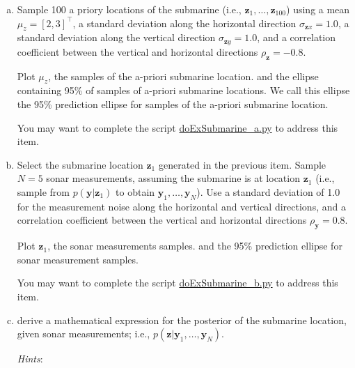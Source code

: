 \documentclass[12pt]{article}
\begin{document}
\begin{enumerate}[(a)]

    \item Sample 100 a priory locations of the submarine
        (i.e., $\mathbf{z}_1,\ldots,\mathbf{z}_{100}$) using
        a mean $\mu_z=[2,3]^\intercal$, a standard deviation along the
        horizontal direction $\sigma_{\mathbf{z}x}=1.0$, a standard
        deviation along the vertical direction $\sigma_{\mathbf{z}y}=1.0$,
        and a correlation coefficient between the vertical and horizontal
        directions $\rho_{\mathbf{z}}=-0.8$.

        Plot $\mu_z$, the samples of the a-priori submarine location. and the
        ellipse containing 95\% of samples of a-priori submarine locations. We
        call this ellipse the 95\% prediction ellipse for samples of the
        a-priori submarine location.

        You may want to complete the script
        \href{https://github.com/joacorapela/gcnuBridging2023/blob/master/code/scripts/probability/unsupervisedInferenceInTheLinearGaussianModel/doExSubmarine_a.py}{doExSubmarine\_a.py}
        to address this item.

    \item Select the submarine location $\mathbf{z}_1$ generated in
        the previous item. Sample $N=5$ sonar measurements, assuming the
        submarine is at location $\mathbf{z}_1$ (i.e., sample from
        $p(\mathbf{y}|\mathbf{z}_1)$ to obtain
        $\mathbf{y}_1,\ldots,\mathbf{y}_N$). Use a standard deviation of
        1.0 for the measurement noise along the horizontal and vertical
        directions, and a correlation coefficient between the vertical and
        horizontal directions $\rho_{\mathbf{y}}=0.8$.

        Plot $\mathbf{z}_1$, the sonar measurements samples. and the 95\%
        prediction ellipse for sonar measurement samples.

        You may want to complete the script
        \href{https://github.com/joacorapela/gcnuBridging2023/blob/master/code/scripts/probability/unsupervisedInferenceInTheLinearGaussianModel/doExSubmarine_b.py}{doExSubmarine\_b.py}
        to address this item.

    \item derive a mathematical expression for the posterior of the
        submarine location, given sonar measurements; i.e.,
        $p(\mathbf{z}|\mathbf{y}_1,\ldots,\mathbf{y}_N)$.

        \textit{Hints}: 


\end{enumerate}
\end{document}
